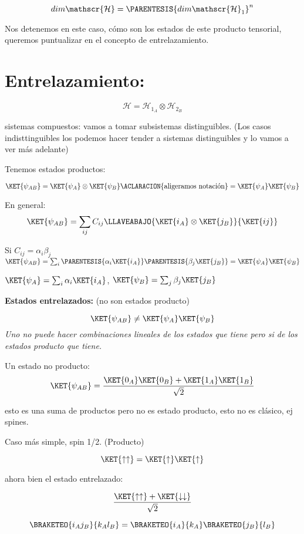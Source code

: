 \[
dim\mathscr{\mathcal{H}}=\PARENTESIS{dim\mathscr{\mathcal{H}}_{1}}^{n}
\]

Nos detenemos en este caso, cómo son los estados de este producto
tensorial, queremos puntualizar en el concepto de entrelazamiento.


\section{Entrelazamiento:}

\[
\mathcal{H}=\mathscr{\mathcal{H}}_{1_{A}}\otimes\mathscr{\mathcal{H}}_{2_{B}}
\]

sistemas compuestos: vamos a tomar subsistemas distinguibles. (Los
casos indisttinguibles los podemos hacer tender a sistemas distinguibles
y lo vamos a ver más adelante)

Tenemos estados productos:

\[
\KET{\psi_{AB}}=\KET{\psi_{A}}\otimes\KET{\psi_{B}}\ACLARACION{\text{aligeramos notación}}=\KET{\psi_{A}}\KET{\psi_{B}}
\]

En general: 
\[
\KET{\psi_{AB}}=\sum_{ij}C_{ij}\LLAVEABAJO{\KET{i_{A}}\otimes\KET{j_{B}}}{\KET{ij}}
\]

Si $C_{ij}=\alpha_{i}\beta_{j}$$\KET{\psi_{AB}}=\sum_{i}\PARENTESIS{\alpha_{i}\KET{i_{A}}}\PARENTESIS{\beta_{j}\KET{j_{B}}}=\KET{\psi_{A}}\KET{\psi_{B}}$

$\KET{\psi_{A}}=\sum_{i}\alpha_{i}\KET{i_{A}}$, $\KET{\psi_{B}}=\sum_{j}\beta_{j}\KET{j_{B}}$

\textbf{Estados entrelazados:} (no son estados producto)

\[
\KET{\psi_{AB}}\neq\KET{\psi_{A}}\KET{\psi_{B}}
\]
\emph{Uno no puede hacer combinaciones lineales de los estados que
tiene pero si de los estados producto que tiene.}

Un estado no producto: 
\[
\KET{\psi_{AB}}=\frac{\KET{0_{A}}\KET{0_{B}}+\KET{1_{A}}\KET{1_{B}}}{\sqrt{2}}
\]

esto es una suma de productos pero no es estado producto, esto no
es clásico, ej spines.

Caso más simple, spin 1/2. (Producto)

\[
\KET{\uparrow\uparrow}=\KET{\uparrow}\KET{\uparrow}
\]

ahora bien el estado entrelazado:

\[
\frac{\KET{\uparrow\uparrow}+\KET{\downarrow\downarrow}}{\sqrt{2}}
\]

\[
\BRAKETEO{i_{A}j_{B}}{k_{A}l_{B}}=\BRAKETEO{i_{A}}{k_{A}}\BRAKETEO{j_{B}}{l_{B}}
\]

